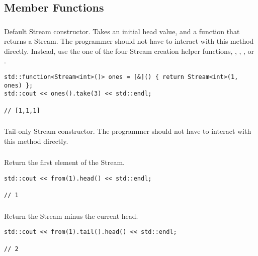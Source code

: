 
\subsection{Member Functions}

\subsubsection{}

Default Stream constructor.
Takes an initial head value, and a function that returns a Stream.
The programmer should not have to interact with this method directly.
Instead, use the one of the four Stream creation helper functions, , , , or .


\begin{lstlisting}[title=example]
std::function<Stream<int>()> ones = [&]() { return Stream<int>(1, ones) };
std::cout << ones().take(3) << std::endl;

// [1,1,1]
\end{lstlisting}

\subsubsection{}

Tail-only Stream constructor.
The programmer should not have to interact with this method directly.

\subsubsection{}

Return the first element of the Stream.

\begin{lstlisting}[title=example]
std::cout << from(1).head() << std::endl;

// 1
\end{lstlisting}

\subsubsection{}

Return the Stream minus the current head.

\begin{lstlisting}[title=example]
std::cout << from(1).tail().head() << std::endl;

// 2
\end{lstlisting}

